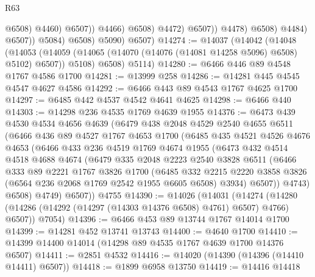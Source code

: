 \begin{lexlean}{R63}
\begin{coremodule}
                                        @6508)
                                      @4460)
                                    @6507))
                                @4466)
                              @6508)
                            @4472)
                          @6507))
                      @4478)
                    @6508)
                  @4484)
                @6507))
            @5084)
          @6508)
        @5090)
      @6507)
@14274 := @14037
    (@14042
      (@14048
        (@14053 (@14059 (@14065 (@14070 (@14076 (@14081 @14258 @5096) @6508) @5102) @6507)) @5108)
        @6508)
      @5114)
@14280 := @6466 @446 @89 @4548 @1767 @4586 @1700
@14281 := @13999 @258
@14286 := @14281 @445 @4545 @4547 @4627 @4586
@14292 := @6466 @443 @89 @4543 @1767 @4625 @1700
@14297 := @6485 @442 @4537 @4542 @4641 @4625
@14298 := @6466 @440
@14303 := @14298 @236 @4535 @1769 @4639 @1955
@14376 := @6473
    @439
    @4530
    @4534
    @4656
    @4639
    (@6479
      @438
      @2048
      @4529
      @2540
      @4655
      @6511
      (@6466
        @436
        @89
        @4527
        @1767
        @4653
        @1700
        (@6485
          @435
          @4521
          @4526
          @4676
          @4653
          (@6466
            @433
            @236
            @4519
            @1769
            @4674
            @1955
            (@6473
              @432
              @4514
              @4518
              @4688
              @4674
              (@6479
                @335
                @2048
                @2223
                @2540
                @3828
                @6511
                (@6466
                  @333
                  @89
                  @2221
                  @1767
                  @3826
                  @1700
                  (@6485
                    @332
                    @2215
                    @2220
                    @3858
                    @3826
                    (@6564 @236 @2068 @1769 @2542 @1955 @6605 @6508)
                    @3934)
                  @6507))
              @4743)
            @6508)
          @4749)
        @6507))
    @4755
@14390 := @14026
    (@14031
      (@14274 (@14280 (@14286 (@14292 (@14297 (@14303 @14376 @6508) @4761) @6507) @4766) @6507))
      @7054)
@14396 := @6466 @453 @89 @13744 @1767 @14014 @1700
@14399 := @14281 @452 @13741 @13743
@14400 := @4640 @1700
@14410 := @14399 @14400 @14014 (@14298 @89 @4535 @1767 @4639 @1700 @14376 @6507)
@14411 := @2851 @4532
@14416 := @14020 (@14390 (@14396 (@14410 @14411) @6507))
@14418 := @1899 @6958 @13750
@14419 := @14416 @14418

\end{coremodule}
\end{lexlean}
